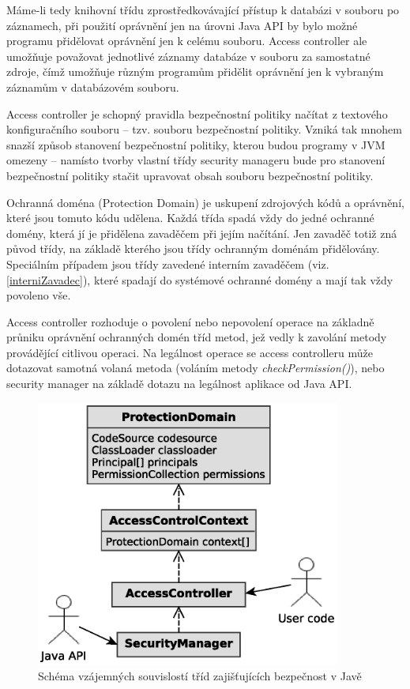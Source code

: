 Máme-li tedy knihovní třídu zprostředkovávající přístup k databázi v souboru po záznamech, při použití oprávnění jen na úrovni Java API by bylo možné programu přidělovat oprávnění jen k celému souboru. Access controller ale umožňuje považovat jednotlivé záznamy databáze v souboru za samostatné zdroje, čímž umožňuje různým programům přidělit oprávnění jen k vybraným záznamům v databázovém souboru.

Access controller je schopný pravidla bezpečnostní politiky načítat z textového konfiguračního souboru -- tzv. souboru bezpečnostní politiky. Vzniká tak mnohem snazší způsob stanovení bezpečnostní politiky, kterou budou programy v JVM omezeny -- namísto tvorby vlastní třídy security manageru bude pro stanovení bezpečnostní politiky stačit upravovat obsah souboru bezpečnostní politiky. \cite[5]{oaks}

Ochranná doména (Protection Domain) je uskupení zdrojových kódů a oprávnění, které jsou tomuto kódu udělena. Každá třída spadá vždy do jedné ochranné domény, která jí je přidělena zavaděčem při jejím načítání. Jen zavaděč totiž zná původ třídy, na základě kterého jsou třídy ochranným doménám přidělovány. Speciálním případem jsou třídy zavedené interním zavaděčem (viz. \ref{interniZavadec}), které spadají do systémové ochranné domény a mají tak vždy povoleno vše. \cite[5.4]{oaks}

Access controller rozhoduje o povolení nebo nepovolení operace na základně průniku oprávnění ochranných domén tříd metod, jež vedly k zavolání metody provádějící citlivou operaci. Na legálnost operace se access controlleru může dotazovat samotná volaná metoda (voláním metody {\it checkPermission()}), nebo security manager na základě dotazu na legálnost aplikace od Java API.

\begin{figure}[ht]
  \centering
  \includegraphics[width=10cm]{fig/security-schema}
  \caption{Schéma vzájemných souvislostí tříd zajišťujících bezpečnost v Javě}
\end{figure}

